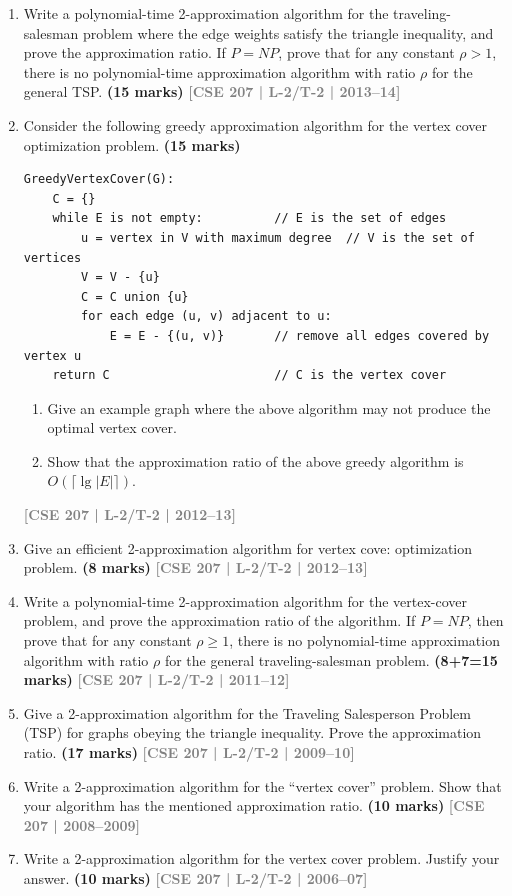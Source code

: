 \documentclass[12pt,a3paper]{article}
\newcommand{\yr}[1]{\hfill\textcolor{gray}{\small\textbf{[#1]}}}
\newcommand{\mk}[1]{\textcolor{orange!70!black}{\small\textbf{(#1 marks)}}}
\begin{document}
\begin{enumerate}
\item Write a polynomial-time 2-approximation algorithm for the traveling-salesman problem where the edge weights satisfy the triangle inequality, and prove the approximation ratio. If $P = NP$, prove that for any constant $\rho > 1$, there is no polynomial-time approximation algorithm with ratio $\rho$ for the general TSP. \mk{15}
\yr{CSE 207 | L-2/T-2 | 2013--14}

\item Consider the following greedy approximation algorithm for the vertex cover optimization problem. \mk{15}

\begin{lstlisting}
GreedyVertexCover(G):
    C = {}
    while E is not empty:          // E is the set of edges
        u = vertex in V with maximum degree  // V is the set of vertices
        V = V - {u}
        C = C union {u}
        for each edge (u, v) adjacent to u:
            E = E - {(u, v)}       // remove all edges covered by vertex u
    return C                       // C is the vertex cover
\end{lstlisting}

\begin{enumerate}
  \item Give an example graph where the above algorithm may not produce the optimal vertex cover.
  \item Show that the approximation ratio of the above greedy algorithm is $O(\lceil \lg |E| \rceil)$.
\end{enumerate}
\yr{CSE 207 | L-2/T-2 | 2012--13}

\item Give an efficient 2-approximation algorithm for vertex cove: optimization problem. \mk{8}
\yr{CSE 207 | L-2/T-2 | 2012--13}

\item Write a polynomial-time 2-approximation algorithm for the vertex-cover problem, and prove the approximation ratio of the algorithm. If $P = NP$, then prove that for any constant $\rho \geq 1$, there is no polynomial-time approximation algorithm with ratio $\rho$ for the general traveling-salesman problem. \mk{8+7=15}
\yr{CSE 207 | L-2/T-2 | 2011--12}


\item Give a 2-approximation algorithm for the Traveling Salesperson Problem (TSP) for graphs obeying the triangle inequality. Prove the approximation ratio. \mk{17}
\yr{CSE 207 | L-2/T-2 | 2009--10}

\item Write a 2-approximation algorithm for the ``vertex cover'' problem. Show that your algorithm has the mentioned approximation ratio. \mk{10}
\yr{CSE 207 | 2008--2009}

\item Write a 2-approximation algorithm for the vertex cover problem. Justify your answer. \mk{10}
\yr{CSE 207 | L-2/T-2 | 2006--07}


\end{enumerate}
\end{document}
